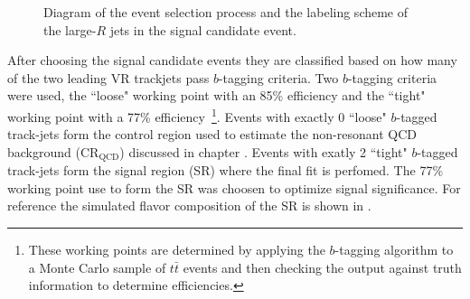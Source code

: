 \begin{figure}[!htbp]
  \centering
{}

  \caption{\cite{Feickert:2690521} Diagram of the event selection process and the labeling scheme of the large-$R$ jets in the signal candidate event.}
  \label{fig:event_selection}
\end{figure}

After choosing the signal candidate events they are classified based on how
many of the two leading VR trackjets pass $b$-tagging criteria.  Two
$b$-tagging criteria were used, the ``loose" working point with an 85\%
efficiency and the ``tight" working point with a 77\%
efficiency~\footnote{These working points are determined by applying the
$b$-tagging algorithm to a Monte Carlo sample of $t\bar{t}$ events and then
checking the output against truth information to determine efficiencies.}.
Events with exactly 0 ``loose" $b$-tagged track-jets form the control region
used to estimate the non-resonant QCD background ($\text{CR}_{\text{QCD}}$)
discussed in chapter .  Events with exatly 2 ``tight"
$b$-tagged track-jets form the signal region (SR) where the final fit is
perfomed.  The 77\% working point use to form the SR was choosen to optimize
signal significance.  For reference the simulated flavor composition of the SR
is shown in .

